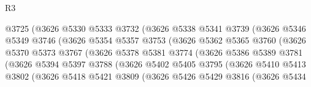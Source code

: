 \begin{lexlean}{R3}
\begin{coremodule}
                            @3725
                            (@3626
                              @5330
                              @5333
                              @3732
                              (@3626
                                @5338
                                @5341
                                @3739
                                (@3626
                                  @5346
                                  @5349
                                  @3746
                                  (@3626
                                    @5354
                                    @5357
                                    @3753
                                    (@3626
                                      @5362
                                      @5365
                                      @3760
                                      (@3626
                                        @5370
                                        @5373
                                        @3767
                                        (@3626
                                          @5378
                                          @5381
                                          @3774
                                          (@3626
                                            @5386
                                            @5389
                                            @3781
                                            (@3626
                                              @5394
                                              @5397
                                              @3788
                                              (@3626
                                                @5402
                                                @5405
                                                @3795
                                                (@3626
                                                  @5410
                                                  @5413
                                                  @3802
                                                  (@3626
                                                    @5418
                                                    @5421
                                                    @3809
                                                    (@3626
                                                      @5426
                                                      @5429
                                                      @3816
                                                      (@3626
                                                        @5434

\end{coremodule}
\end{lexlean}
